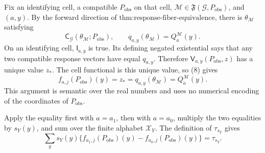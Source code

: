 Fix an identifying cell, a compatible \(P_{\mathrm{obs}}\) on that cell, \(\mathcal M\in\mathfrak F(\mathcal G,P_{\mathrm{obs}})\), and \((a,y)\). By the forward direction of \(\text{thm:response-fiber-equivalence}\), there is \(\theta_{\mathcal M}\) satisfying
\[
\mathsf C_{\mathcal G}(\theta_{\mathcal M};P_{\mathrm{obs}}),
\qquad
q_{a,y}(\theta_{\mathcal M})=Q_a^{\mathcal M}(y).
\tag{8}
\]
On an identifying cell, \(\mathsf I_{a,y}\) is true. Its defining negated existential says that any two compatible response vectors have equal \(q_{a,y}\). Therefore \(\mathsf V_{a,y}(P_{\mathrm{obs}},z)\) has a unique value \(z_*\). The cell functional is this unique value, so (8) gives
\[
f_{a,j}(P_{\mathrm{obs}})(y)=z_*=q_{a,y}(\theta_{\mathcal M})=Q_a^{\mathcal M}(y).
\]
This argument is semantic over the real numbers and uses no numerical encoding of the coordinates of \(P_{\mathrm{obs}}\).

Apply the equality first with \(a=a_1\), then with \(a=a_0\), multiply the two equalities by \(s_Y(y)\), and sum over the finite alphabet \(\mathcal X_Y\). The definition of \(\tau_{s_Y}\) gives
\[
\sum_y s_Y(y)\{f_{a_1,j}(P_{\mathrm{obs}})(y)-f_{a_0,j}(P_{\mathrm{obs}})(y)\}
=\tau_{s_Y}.
\]